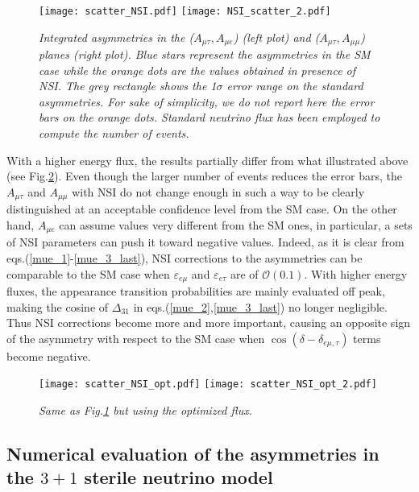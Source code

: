 \documentclass[12pt]{article}
\begin{document}
\begin{figure}
    \centering
    \texttt{[image: scatter\_NSI.pdf]}
    \texttt{[image: NSI\_scatter\_2.pdf]}
    \caption{\it Integrated asymmetries in the ($A_{\mu\tau}, A_{\mu e}$) (left plot) and ($A_{\mu\tau}, A_{\mu \mu}$) planes (right plot). Blue stars represent the asymmetries in the SM case while the orange dots are the values obtained in presence of NSI. The grey rectangle shows the 1$\sigma$ error range on the standard asymmetries. For sake of simplicity, we do not report here the error bars on the orange dots. Standard neutrino flux has been employed to compute the number of events.}
    \label{NSIscatter}
\end{figure}
With a higher energy flux, the results partially differ from what illustrated above (see Fig.\ref{NSIscatteropt}). Even though the larger number of events reduces the error bars, 
the $A_{\mu\tau}$ and $A_{\mu\mu}$ with NSI do not change enough in such a way to be clearly distinguished at an acceptable confidence level from the SM case. On the other hand, $A_{\mu e}$ can assume values very different from the SM ones, in particular, a sets of NSI parameters can push it toward negative values. 
Indeed, as it is clear from eqs.(\ref{mue_1}-\ref{mue_3_last}),  NSI corrections to the asymmetries can be comparable to the SM case when  $\varepsilon_{e\mu}$ and $\varepsilon_{e\tau}$ are of $\mathcal{O}(0.1)$. With higher energy fluxes, the appearance transition probabilities are mainly evaluated off peak, making the cosine of $\Delta_{31}$ in eqs.(\ref{mue_2},\ref{mue_3_last}) no longer negligible. Thus NSI corrections become more and more important, causing an opposite sign of the asymmetry with respect to the SM case when $\cos(\delta-\delta_{e\mu,\tau})$ terms become negative.
\begin{figure}
    \centering
    \texttt{[image: scatter\_NSI\_opt.pdf]}
    \texttt{[image: scatter\_NSI\_opt\_2.pdf]}
    \caption{\it Same as Fig.\ref{NSIscatter} but using the optimized flux.}
    \label{NSIscatteropt}
\end{figure}


\subsection{Numerical evaluation of the asymmetries in the $3+1$ sterile neutrino model}
\end{document}

